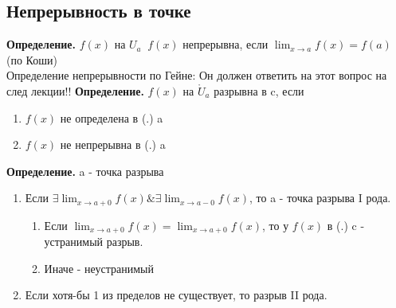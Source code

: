 \documentclass[12pt, a4paper]{article}
\begin{document}
\subsection{Непрерывность в точке}
\textbf{Определение.} $f(x)$ на $U_a \;\; f(x)$ непрерывна, если $\lim_{x\to a} f(x) = f(a)$ (по Коши) \\
Определение непрерывности по Гейне: Он должен ответить на этот вопрос на след лекции!!
\textbf{Определение.} $f(x)$ на $\mathring U_a$ разрывна в c, если 
\begin{enumerate}
	\item $f(x)$ не определена в (.) a
	\item $f(x)$ не непрерывна в (.) a
\end{enumerate}
\textbf{Определение.} a - точка разрыва
\begin{enumerate}
	\item Если $\exists \lim _{x\to a+ 0} f(x) \& \exists \lim _{x\to a-0} f(x)$, то a - точка разрыва I рода. 
		\begin{enumerate}
			\item Если $\lim _{x\to a+ 0} f(x) = \lim _{x\to a+ 0} f(x)$, то у $f(x)$ в (.) c - устранимый разрыв. 
			\item Иначе - неустранимый
		\end{enumerate}
	\item Если хотя-бы 1 из пределов не существует, то разрыв II рода.
\end{enumerate}
\end{document}

